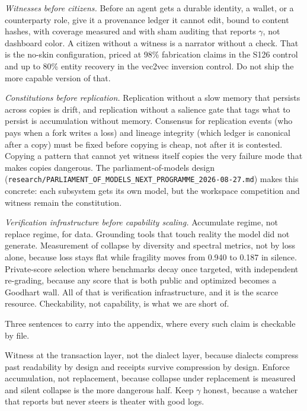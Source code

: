 \textit{Witnesses before citizens.} Before an agent gets a durable identity, a wallet, or a counterparty role, give it a provenance ledger it cannot edit, bound to content hashes, with coverage measured and with sham auditing that reports $\gamma$, not dashboard color. A citizen without a witness is a narrator without a check. That is the no-skin configuration, priced at 98\% fabrication claims in the S126 control and up to 80\% entity recovery in the vec2vec inversion control. Do not ship the more capable version of that.

\textit{Constitutions before replication.} Replication without a slow memory that persists across copies is drift, and replication without a salience gate that tags what to persist is accumulation without memory. Consensus for replication events (who pays when a fork writes a loss) and lineage integrity (which ledger is canonical after a copy) must be fixed before copying is cheap, not after it is contested. Copying a pattern that cannot yet witness itself copies the very failure mode that makes copies dangerous. The parliament-of-models design (\texttt{research/PARLIAMENT\_OF\_MODELS\_NEXT\_PROGRAMME\_2026-08-27.md}) makes this concrete: each subsystem gets its own model, but the workspace competition and witness remain the constitution.

\textit{Verification infrastructure before capability scaling.} Accumulate regime, not replace regime, for data. Grounding tools that touch reality the model did not generate. Measurement of collapse by diversity and spectral metrics, not by loss alone, because loss stays flat while fragility moves from 0.940 to 0.187 in silence. Private-score selection where benchmarks decay once targeted, with independent re-grading, because any score that is both public and optimized becomes a Goodhart wall. All of that is verification infrastructure, and it is the scarce resource. Checkability, not capability, is what we are short of.

Three sentences to carry into the appendix, where every such claim is checkable by file.

Witness at the transaction layer, not the dialect layer, because dialects compress past readability by design and receipts survive compression by design. Enforce accumulation, not replacement, because collapse under replacement is measured and silent collapse is the more dangerous half. Keep $\gamma$ honest, because a watcher that reports but never steers is theater with good logs.

